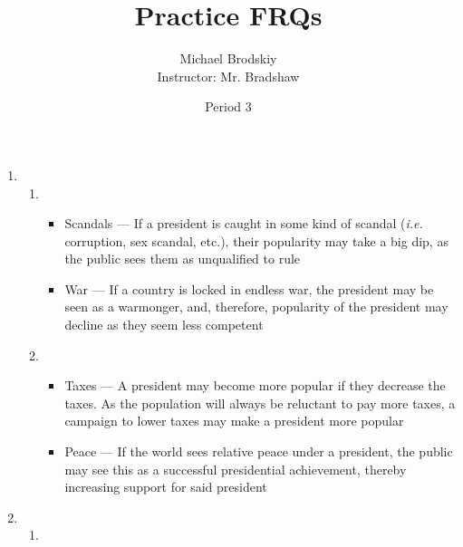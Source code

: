 \documentclass[12pt]{article}
\title{Practice FRQs}
\date{Period 3}
\author{Michael Brodskiy\\ \small Instructor: Mr. Bradshaw}
\begin{document}
\maketitle

\begin{enumerate}

  \item

    \begin{enumerate}

      \item

        \begin{itemize}

          \item Scandals — If a president is caught in some kind of scandal (\textit{i.e.} corruption, sex scandal, etc.), their popularity may take a big dip, as the public sees them as unqualified to rule

          \item War — If a country is locked in endless war, the president may be seen as a warmonger, and, therefore, popularity of the president may decline as they seem less competent

        \end{itemize}

      \item 

        \begin{itemize}

          \item Taxes — A president may become more popular if they decrease the taxes. As the population will always be reluctant to pay more taxes, a campaign to lower taxes may make a president more popular

          \item Peace — If the world sees relative peace under a president, the public may see this as a successful presidential achievement, thereby increasing support for said president

        \end{itemize}

    \end{enumerate}

  \item

    \begin{enumerate}

      \item 


\end{enumerate}
\end{enumerate}
\end{document}

